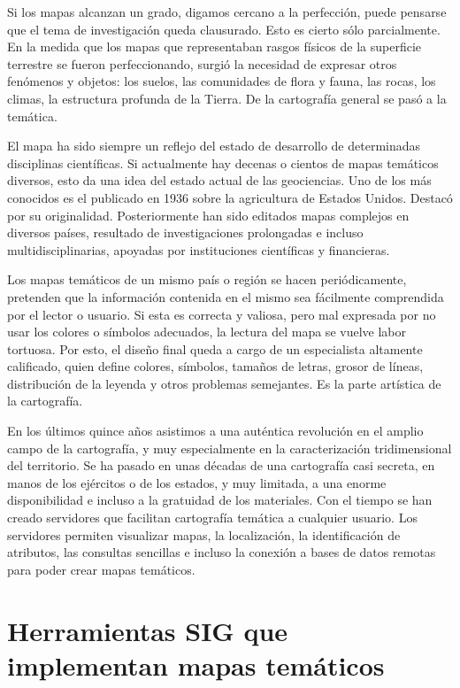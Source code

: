 Si los mapas alcanzan un grado, digamos cercano a la perfecci\'on, puede pensarse que el tema de investigaci\'on queda clausurado. Esto es cierto s\'olo parcialmente. En la medida que los mapas que representaban rasgos f\'isicos de la superficie terrestre se fueron perfeccionando, surgi\'o la necesidad de expresar otros fen\'omenos y objetos: los suelos, las comunidades de flora y fauna, las rocas, los climas, la estructura profunda de la Tierra. De la cartograf\'ia general se pas\'o a la tem\'atica.

El mapa ha sido siempre un reflejo del estado de desarrollo de determinadas disciplinas cient\'ificas. Si actualmente hay decenas o cientos de mapas tem\'aticos diversos, esto da una idea del estado actual de las geociencias. Uno de los m\'as conocidos es el publicado en 1936 sobre la agricultura de Estados Unidos. Destac\'o por su originalidad. Posteriormente han sido editados mapas complejos en diversos pa\'ises, resultado de investigaciones prolongadas e incluso multidisciplinarias, apoyadas por instituciones cient\'ificas y financieras.

Los mapas tem\'aticos de un mismo pa\'is o regi\'on se hacen peri\'odicamente, pretenden que la informaci\'on contenida en el mismo sea f\'acilmente comprendida por el lector o usuario. Si esta es correcta y valiosa, pero mal expresada por no usar los colores o s\'imbolos adecuados, la lectura del mapa se vuelve labor tortuosa. Por esto, el dise\~no final queda a cargo de un especialista altamente calificado, quien define colores, s\'imbolos, tama\~nos de letras, grosor de l\'ineas, distribuci\'on de la leyenda y otros problemas semejantes. Es la parte art\'istica de la cartograf\'ia. \cite{histTematico}

En los \'ultimos quince a\~nos asistimos a una aut\'entica revoluci\'on en el amplio campo de la cartograf\'ia, y muy especialmente en la caracterizaci\'on tridimensional del territorio. Se ha pasado en unas d\'ecadas de una cartograf\'ia casi secreta, en manos de los ej\'ercitos o de los estados, y muy limitada, a una enorme disponibilidad e incluso a la gratuidad de los materiales. Con el tiempo se han creado servidores que facilitan cartograf\'ia tem\'atica a cualquier usuario. Los servidores permiten visualizar mapas, la localizaci\'on, la identificaci\'on de atributos, las consultas sencillas e incluso la conexi\'on a bases de datos remotas para poder crear mapas tem\'aticos. \cite{sigTematico}



\section{Herramientas SIG que implementan mapas tem\'aticos}

